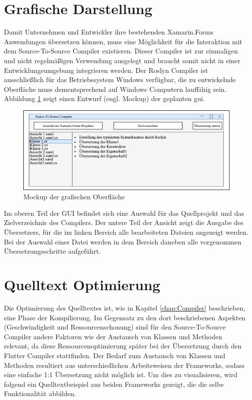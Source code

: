 \section{Grafische Darstellung}
Damit Unternehmen und Entwickler ihre bestehenden Xamarin.Forms Anwendungen übersetzen können, muss eine Möglichkeit für die Interaktion mit dem Source-To-Source Compiler existieren.  Dieser Compiler ist zur einmaligen und nicht regelmäßigen Verwendung ausgelegt und braucht somit nicht in einer Entwicklungsumgebung integrieren werden.  Der Roslyn Compiler ist ausschließlich für das Betriebssystem Windows verfügbar,  die zu entwickelnde Oberfläche muss dementsprechend auf Windows Computern lauffähig sein.  Abbildung \ref{fig:UiMockup} zeigt einen Entwurf (engl. Mockup) der geplanten \ac{gui}.

\begin{figure}[!ht]
 \includegraphics[width=\textwidth,keepaspectratio]{Images/CompilerArchitecture/Mockup.png}
 \caption{Mockup der grafischen Oberfläche}
 \label{fig:UiMockup}
\end{figure}

Im oberen Teil der GUI befindet sich eine Auswahl für das Quellprojekt und das Zielverzeichnis des Compilers.  Der untere Teil der Ansicht zeigt die Ausgabe des Übersetzers,  für die im linken Bereich alle bearbeiteten Dateien angezeigt werden.  Bei der Auswahl einer Datei werden in dem Bereich daneben alle vorgenommen Übersetzungsschritte aufgeführt.

\section{Quelltext Optimierung}
Die Optimierung des Quelltextes ist, wie in Kapitel \ref{chap:Compiler} beschrieben,  eine Phase der Kompilierung.  Im Gegensatz zu den dort beschriebenen Aspekten (Geschwindigkeit und Ressourcenschonung) sind für den Source-To-Source Compiler andere Faktoren wie der Austausch von Klassen und Methoden relevant,  da diese Ressourcenoptimierung später bei der Übersetzung durch den Flutter Compiler stattfinden.   
Der Bedarf zum Austausch von Klassen und Methoden resultiert aus unterschiedlichen Arbeitsweisen der Frameworks,  sodass eine einfache 1:1 Übersetzung nicht möglich ist.  Um dies zu visualisieren, wird folgend ein Quelltextbeispiel aus beiden Frameworks gezeigt,  die die selbe Funktionalität abbilden.

